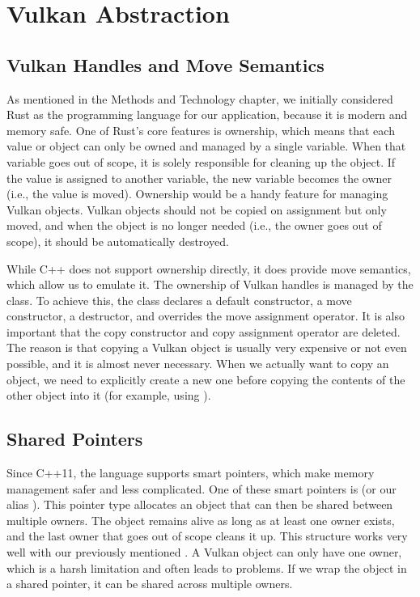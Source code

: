 
\section{Vulkan Abstraction}

\subsection{Vulkan Handles and Move Semantics}

As mentioned in the Methods and Technology chapter, we initially considered Rust as the programming language for our application, because it is modern and memory safe. One of Rust's core features is ownership, which means that each value or object can only be owned and managed by a single variable. When that variable goes out of scope, it is solely responsible for cleaning up the object. If the value is assigned to another variable, the new variable becomes the owner (i.e., the value is moved). Ownership would be a handy feature for managing Vulkan objects. Vulkan objects should not be copied on assignment but only moved, and when the object is no longer needed (i.e., the owner goes out of scope), it should be automatically destroyed.

While C++ does not support ownership directly, it does provide move semantics, which allow us to emulate it. The ownership of Vulkan handles is managed by the  class. To achieve this, the class declares a default constructor, a move constructor, a destructor, and overrides the move assignment operator. It is also important that the copy constructor and copy assignment operator are deleted. The reason is that copying a Vulkan object is usually very expensive or not even possible, and it is almost never necessary. When we actually want to copy an object, we need to explicitly create a new one before copying the contents of the other object into it (for example, using ).

\subsection{Shared Pointers}

Since C++11, the language supports smart pointers, which make memory management safer and less complicated. One of these smart pointers is  (or our alias ). This pointer type allocates an object that can then be shared between multiple owners. The object remains alive as long as at least one owner exists, and the last owner that goes out of scope cleans it up. This structure works very well with our previously mentioned . A Vulkan object can only have one owner, which is a harsh limitation and often leads to problems. If we wrap the object in a shared pointer, it can be shared across multiple owners.

